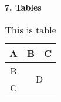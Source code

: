 ~\\ \\ %
\textbf{7. Tables} \\
\begingroup
\setlength{\tabcolsep}{8pt} %
\renewcommand{\arraystretch}{1.4} %
\begin{table}[!htbp]
  \centering
  \begin{tabular}[c]{|c|c|c|}
    \rowcolor[HTML]{DAE8FC}
    \hline
    A & B & C \\ \hline
    B & \multicolumn{2}{c|}{\multirow{2}{*}{D}} \\ \cline{1-1}
    C & \multicolumn{2}{c|}{} \\ \hline
  \end{tabular}
\caption{This is table}
\label{tab:Table}
\end{table}
\endgroup